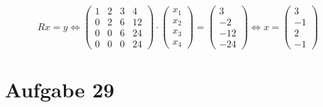\documentclass[10pt,a4paper]{article}
\begin{document}
\begin{equation}
  Rx = y
  \Leftrightarrow
  \begin{pmatrix}
    1 & 2 & 3 & 4\\
    0 & 2 & 6 & 12\\
    0 & 0 & 6 & 24\\
    0 & 0 & 0 & 24
  \end{pmatrix}
  \cdot
  \begin{pmatrix}
    x_{1}\\x_{2}\\x_{3}\\x_{4}
  \end{pmatrix}
  =
  \begin{pmatrix}
    3\\-2\\-12\\-24
  \end{pmatrix}
  \Leftrightarrow
  x = \begin{pmatrix}
    3\\-1\\2\\-1
  \end{pmatrix}
\end{equation}

\section{Aufgabe 29}
\end{document}
